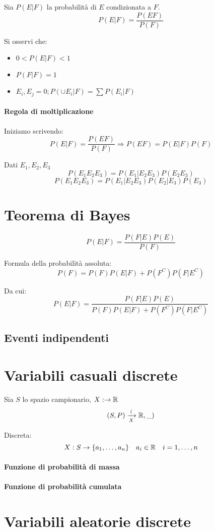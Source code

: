 Sia $P(E|F)$ la probabilità di $E$ condizionata a $F$.
\[
  P(E|F)= \frac{P(EF)}{P(F)} 
\]

Si osservi che:
\begin{itemize}
  \item $0<P(E|F)<1$
  \item $P(F|F)=1$
  \item $E_i,E_j=0;P(\cup E_i|F)=\sum P(E_i|F)$
\end{itemize}

\paragraph{Regola di moltiplicazione}%
\label{par:Regola di moltiplicazione}
Iniziamo scrivendo:
\[
  P(E|F)= \frac{P(EF)}{P(F)}\Rightarrow P(EF)=P(E|F)P(F)
\]

Dati $E_1,E_2,E_3$
\[
  P(E_1 E_2 E_3)=P(E_1|E_2 E_3)P(E_2 E_3)
\]
\[
  P(E_1 E_2 E_3)=P(E_1|E_2 E_3)P(E_2|E_3)P(E_3)
\]

\section{Teorema di Bayes}%
\label{sec:Teorema di Bayes}
\[
  P(E|F)= \frac{P(F|E)P(E)}{P(F)} 
\]

Formula della probabilità assoluta:
\[
  P(F)=P(F)P(E|F)+P(F^C)P(F|E^C)
\]

Da cui:
\[
  P(E|F)= \frac{P(F|E)P(E)}{P(F)P(E|F)+P(F^C)P(F|E^C)
} 
\]

\subsection{Eventi indipendenti}%
\label{sub:Eventi indipendenti}

\section{Variabili casuali discrete}%
\label{sec:Variabili casuali discrete}
Sia $S$ lo spazio campionario, $X:\rightarrow\mathbb{R}$
\[
  (S,P)\xrightarrow[X](\mathbb{R},\_)
\]

\begin{definizione}
  Discreta:
  \[
    X:S\rightarrow\{a_1,\dots,a_n\}\quad a_i\in\mathbb{R}\quad i=1,\dots,n
  \]
\end{definizione}

\paragraph{Funzione di probabilità di massa}%
\label{par:Funzione di probabilità di massa}

\paragraph{Funzione di probabilità cumulata}%
\label{par:Funzione di probabilità cumulata}

\section{Variabili aleatorie discrete}%
\label{sec:Variabili aleatorie discrete}
